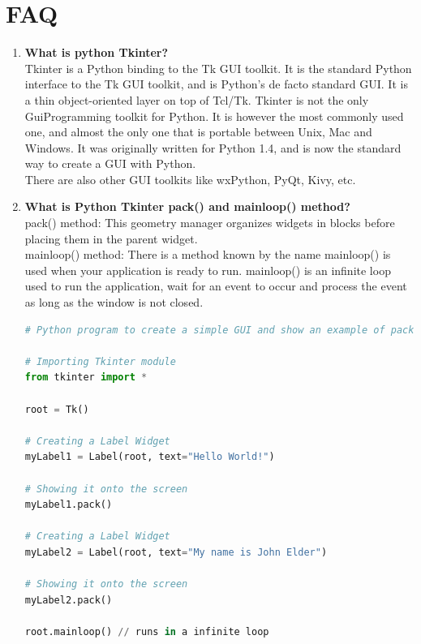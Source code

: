 \documentclass[11pt]{article}
\begin{document}
\section{FAQ}
\begin{enumerate}
\item \textbf{What is python Tkinter?}\\

Tkinter is a Python binding to the Tk GUI toolkit. It is the standard Python interface to the Tk GUI toolkit, and is Python's de facto standard GUI.
It is a thin object-oriented layer on top of Tcl/Tk. Tkinter is not the only GuiProgramming toolkit for Python. It is however the most commonly used one, and almost the only one that is portable between Unix, Mac and Windows. It was originally written for Python 1.4, and is now the standard way to create a GUI with Python. \\

There are also other GUI toolkits like wxPython, PyQt, Kivy, etc. \\

\item \textbf{What is Python Tkinter pack() and mainloop() method?}\\

pack() method: This geometry manager organizes widgets in blocks before placing them in the parent widget.\\

mainloop() method: There is a method known by the name mainloop() is used when your application is ready to run. mainloop() is an infinite loop used to run the application, wait for an event to occur and process the event as long as the window is not closed.\\

\begin{lstlisting}[language=python]
# Python program to create a simple GUI and show an example of pack() method and mainloop() method

# Importing Tkinter module
from tkinter import *

root = Tk()

# Creating a Label Widget
myLabel1 = Label(root, text="Hello World!")

# Showing it onto the screen
myLabel1.pack()

# Creating a Label Widget
myLabel2 = Label(root, text="My name is John Elder")

# Showing it onto the screen
myLabel2.pack()

root.mainloop() // runs in a infinite loop

\end{lstlisting}

\end{enumerate}
\end{document}
